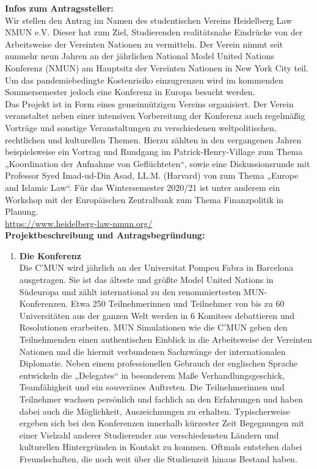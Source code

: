 {}{
    \textbf{Infos zum Antragssteller:}\\
    Wir stellen den Antrag im Namen des studentischen Vereins Heidelberg Law NMUN e.V. Dieser hat zum Ziel, Studierenden realitätsnahe Eindrücke von der Arbeitsweise der Vereinten Nationen zu vermitteln. Der Verein nimmt seit nunmehr neun Jahren an der jährlichen National Model United Nations Konferenz (NMUN) am Hauptsitz der Vereinten Nationen in New York City teil. Um das pandemiebedingte Kostenrisiko einzugrenzen wird im kommenden Sommersemester jedoch eine Konferenz in Europa besucht werden.\\
    Das Projekt ist in Form eines gemeinnützigen Vereins organisiert. Der Verein veranstaltet neben einer intensiven Vorbereitung der Konferenz auch regelmäßig Vorträge und sonstige Veranstaltungen zu verschiedenen weltpolitischen, rechtlichen und kulturellen Themen. Hierzu zählten in den vergangenen Jahren beispielsweise ein Vortrag und Rundgang im Patrick-Henry-Village zum Thema „Koordination der Aufnahme von Geflüchteten“, sowie eine Diskussionsrunde mit Professor Syed Imad-ud-Din Asad, LL.M. (Harvard) von zum Thema „Europe and Islamic Law“. Für das Wintersemester 2020/21 ist unter anderem ein Workshop mit der Europäischen Zentralbank zum Thema Finanzpolitik in Planung.\\
    \url{https://www.heidelberg-law-nmun.org/}\\[1em]
    \textbf{Projektbeschreibung und Antragsbegründung:}\\
    \begin{enumerate}
        \item \textbf{Die Konferenz}\\ Die C’MUN wird jährlich an der Universitat Pompeu Fabra in Barcelona ausgetragen. Sie ist das älteste und größte Model United Nations in Südeuropa und zählt international zu den renommiertesten MUN-Konferenzen. Etwa 250 Teilnehmerinnen und Teilnehmer von bis zu 60 Universitäten aus der ganzen Welt werden in 6 Komitees debattieren und Resolutionen erarbeiten. MUN Simulationen wie die C’MUN geben den Teilnehmenden einen authentischen Einblick in die Arbeitsweise der Vereinten Nationen und die hiermit verbundenen Sachzwänge der internationalen Diplomatie. Neben einem professionellen Gebrauch der englischen Sprache entwickeln die „Delegates“ in besonderem Maße Verhandlungsgeschick, Teamfähigkeit und ein souveränes Auftreten. Die Teilnehmerinnen und Teilnehmer wachsen persönlich und fachlich an den Erfahrungen und haben dabei auch die Möglichkeit, Auszeichnungen zu erhalten. Typischerweise ergeben sich bei den Konferenzen innerhalb kürzester Zeit Begegnungen mit einer Vielzahl anderer Studierender aus verschiedensten Ländern und kulturellen Hintergründen in Kontakt zu kommen. Oftmals entstehen dabei Freundschaften, die noch weit über die Studienzeit hinaus Bestand haben.

\end{enumerate}}
